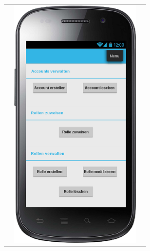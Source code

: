 \documentclass[german,a4paper]{beamer}
\begin{document}
\begin{frame}
\begin{tabular}{ccc}
  &
  \includegraphics[height=0.75\textheight]{./mockups/mockup_main_adminmode.png}
\end{tabular}
\end{frame}
\end{document}
